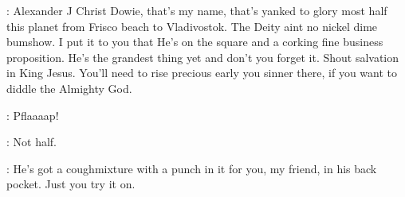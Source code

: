 \dowie: Alexander J Christ Dowie, that's my name, that's
yanked to glory most half this planet from Frisco beach to Vladivostok.
The Deity aint no nickel dime bumshow. I put it to you that He's on the
square and a corking fine business proposition. He's the grandest thing
yet and don't you forget it. Shout salvation in King Jesus. You'll need
to rise precious early you sinner there, if you want to diddle the
Almighty God.

: Pflaaaap!

\stephen: Not half.

\dowie: He's got a coughmixture with a punch in it for you, my friend,
in his back pocket. Just you try it on.


